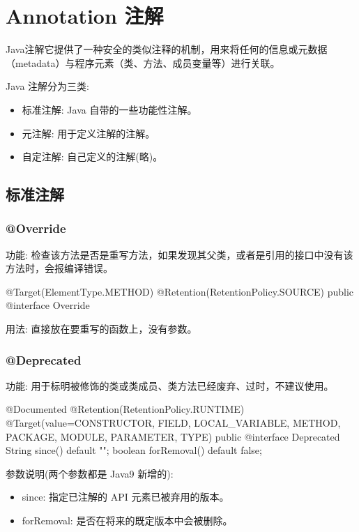 \section{Annotation 注解}

Java注解它提供了一种安全的类似注释的机制，用来将任何的信息或元数据（metadata）与程序元素（类、方法、成员变量等）进行关联。

Java 注解分为三类:
\begin{itemize}
    \item 标准注解: Java 自带的一些功能性注解。
    \item 元注解: 用于定义注解的注解。
    \item 自定注解: 自己定义的注解(略)。
\end{itemize}

\subsection{标准注解}

\subsubsection*{@Override}

功能: 检查该方法是否是重写方法，如果发现其父类，或者是引用的接口中没有该方法时，会报编译错误。

\begin{Java}
@Target(ElementType.METHOD)
@Retention(RetentionPolicy.SOURCE)
public @interface Override {}
\end{Java}

用法: 直接放在要重写的函数上，没有参数。

\subsubsection*{@Deprecated}

功能: 用于标明被修饰的类或类成员、类方法已经废弃、过时，不建议使用。

\begin{Java}
@Documented
@Retention(RetentionPolicy.RUNTIME)
@Target(value={CONSTRUCTOR, FIELD, LOCAL_VARIABLE, METHOD, PACKAGE, MODULE, PARAMETER, TYPE})
public @interface Deprecated {
    String since() default "";
    boolean forRemoval() default false;
}
\end{Java}

参数说明(两个参数都是 Java9 新增的):
\begin{itemize}
    \item since: 指定已注解的 API 元素已被弃用的版本。
    \item forRemoval: 是否在将来的既定版本中会被删除。
\end{itemize}

